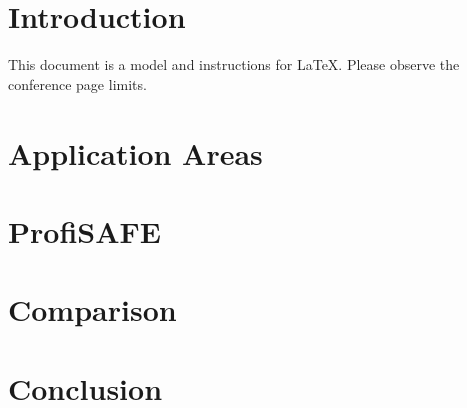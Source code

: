 \documentclass[conference]{IEEEtran}
\begin{document}
\section{Introduction}
This document is a model and instructions for \LaTeX.
Please observe the conference page limits. 

\section{Application Areas}
\section{ProfiSAFE}
\section{Comparison}
\section{Conclusion}
\end{document}
